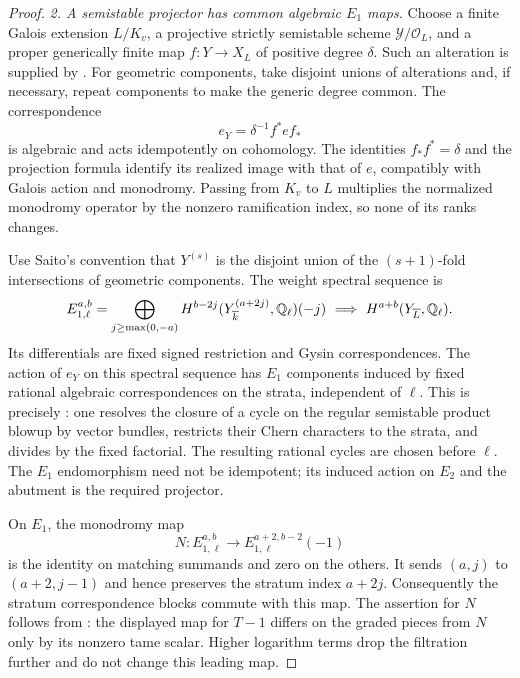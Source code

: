 \begin{proof}
\emph{2. A semistable projector has common algebraic $E_1$ maps.}
Choose a finite Galois extension $L/K_v$, a projective strictly
semistable scheme $\mathcal Y/\mathcal O_L$, and a proper
generically finite map $f:Y\to X_L$ of positive degree $\delta$.
Such an alteration is supplied by
\citet[Corollary~1.2.6, author p.~16]{c_saito2003weights}.
For geometric components, take disjoint unions of alterations and,
if necessary, repeat components to make the generic degree common.
The correspondence
\[
                 e_Y=\delta^{-1}f^* e f_*
\]
is algebraic and acts idempotently on cohomology. The identities $f_*f^*=\delta$ and
the projection formula identify its realized image with that of
$e$, compatibly with Galois action and monodromy.
Passing from $K_v$ to $L$ multiplies the normalized monodromy
operator by the nonzero ramification index, so none of its ranks
changes.

Use Saito's convention that $Y^{(s)}$ is the disjoint union of the
$(s+1)$-fold intersections of geometric components. The weight
spectral sequence is
\[
 E_{1,\ell}^{a,b}
 =\bigoplus_{j\geq\max(0,-a)}
 H^{b-2j}(Y^{(a+2j)}_{\overline k},\mathbb Q_\ell)(-j)
 \ \Longrightarrow\ H^{a+b}(Y_{\overline L},\mathbb Q_\ell).
\]
Its differentials are fixed signed restriction and Gysin
correspondences. The action of $e_Y$ on this spectral sequence
has $E_1$ components induced by fixed rational algebraic
correspondences on the strata, independent of $\ell$.
This is precisely
\citet[Lemma~2.4.2, Corollary~2.4.3 and Proposition~2.4.4,
complete proofs, author pp.~34--36]{c_saito2003weights}:
one resolves the closure of a cycle on the regular semistable
product blowup by vector bundles, restricts their Chern characters
to the strata, and divides by the fixed factorial.
The resulting rational cycles are chosen before $\ell$.
The $E_1$ endomorphism need not be idempotent; its induced action
on $E_2$ and the abutment is the required projector.

On $E_1$, the monodromy map
\[
 N:E_{1,\ell}^{a,b}\longrightarrow
       E_{1,\ell}^{a+2,b-2}(-1)
\]
is the identity on matching summands and zero on the others.
It sends $(a,j)$ to $(a+2,j-1)$ and hence preserves the stratum
index $a+2j$. Consequently the stratum correspondence blocks
commute with this map. The assertion for $N$ follows from
\citet[Corollary~2.2.4(2), author pp.~21--22]{c_saito2003weights}:
the displayed map for $T-1$ differs on the graded pieces from
$N$ only by its nonzero tame scalar. Higher logarithm terms drop
the filtration further and do not change this leading map.


\end{proof}

